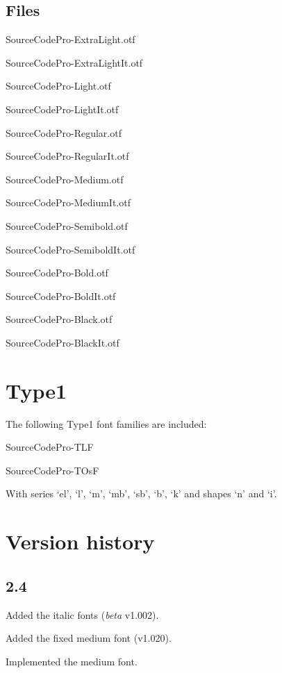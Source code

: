 \documentclass[10pt,a4paper,english]{article}
\begin{document}
\begin{multicols}{2}
\subsection{Files}
\begin{itemize*}
	\item SourceCodePro-ExtraLight.otf
	\item SourceCodePro-ExtraLightIt.otf
	\item SourceCodePro-Light.otf
	\item SourceCodePro-LightIt.otf
	\item SourceCodePro-Regular.otf
	\item SourceCodePro-RegularIt.otf
	\item SourceCodePro-Medium.otf
	\item SourceCodePro-MediumIt.otf	
	\item SourceCodePro-Semibold.otf
	\item SourceCodePro-SemiboldIt.otf
	\item SourceCodePro-Bold.otf
	\item SourceCodePro-BoldIt.otf
	\item SourceCodePro-Black.otf
	\item SourceCodePro-BlackIt.otf
\end{itemize*}

\section{Type1}
The following Type1 font families are included:
\begin{itemize*}
	\item SourceCodePro-TLF
	\item SourceCodePro-TOsF
\end{itemize*}
With series ‘el’, ‘l’, ‘m’, ‘mb’, ‘sb’, ‘b’, ‘k’ and shapes ‘n’ and ‘i’.

\section{Version history}
\subsection*{2.4}
\begin{itemize*}
	\item Added the italic fonts (\emph{beta} v1.002).
	\item Added the fixed medium font (v1.020).
	\item Implemented the medium font.
\end{itemize*}


\end{multicols}
\end{document}
